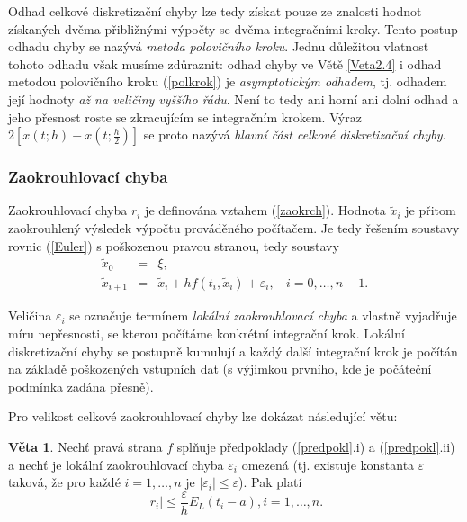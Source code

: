 \documentclass[a4paper, 12pt]{book}
\theoremstyle{definition}
\newtheorem{theorem}{Věta}[section]
\begin{document}
Odhad celkové diskretizační chyby lze tedy získat pouze ze znalosti
hodnot získaných dvěma přibližnými výpočty se dvěma integračními kroky.
Tento postup odhadu chyby se nazývá {\em metoda polovičního kroku}.
Jednu důležitou vlatnost tohoto odhadu však musíme zdůraznit: odhad
chyby ve Větě \ref{Veta2.4} i odhad metodou polovičního kroku 
(\ref{polkrok}) je {\em asymptotickým odhadem}, tj. odhadem její
hodnoty {\em až na veličiny vyššího řádu}. Není to tedy ani horní ani
dolní odhad a jeho přesnost roste se zkracujícím se integračním krokem.
Výraz $2[x(t;h)-x(t;\frac h2)]$ se proto nazývá {\em hlavní část
celkové diskretizační chyby}.

\subsubsection{Zaokrouhlovací chyba}
Zaokrouhlovací chyba $r_i$ je definována vztahem (\ref{zaokrch}). 
Hodnota $\tilde x_i$ je přitom zaokrouhlený výsledek výpočtu prováděného
počítačem. Je tedy řešením soustavy rovnic (\ref{Euler}) s poškozenou pravou
stranou, tedy soustavy
\begin{equation}\label{poskEuler}
\begin{array}{crl}
\tilde x_0 & =& \xi,\\
\tilde x_{i+1} &=&\tilde x_i+h f(t_i,\tilde x_i) + \varepsilon_i,~~~~ i=0,\dots,n-1.
\end{array}
\end{equation}

Veličina $\varepsilon_i$ se označuje termínem {\em lokální zaokrouhlovací chyba}
a vlastně vyjadřuje míru nepřesnosti, se kterou počítáme konkrétní integrační 
krok. Lokální diskretizační chyby se postupně kumulují a každý další integrační
krok je počítán na základě poškozených vstupních dat (s výjimkou prvního, kde 
je počáteční podmínka zadána přesně).

Pro velikost celkové zaokrouhlovací chyby lze dokázat následující větu:
\begin{theorem}\label{Veta2.5}
Nechť pravá strana $f$ splňuje předpoklady (\ref{predpokl}.i) a (\ref{predpokl}.ii) 
a nechť je lokální zaokrouhlovací chyba $\varepsilon_i$ omezená (tj. existuje 
konstanta $\varepsilon$ taková, že pro každé $i=1,\dots,n$ je $|\varepsilon_i|
\leq\varepsilon$). Pak platí
\begin{equation}\label{zaokrchEuler}
|r_i|\leq \frac\varepsilon h E_L(t_i-a), i=1,\dots,n.
\end{equation}
\end{theorem}
\end{document}
